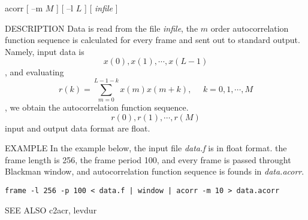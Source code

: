 
\begin{synopsis}
 \item[ acorr ] [ --m $M$ ] [ --l $L$ ] [ {\em infile} ]
\end{synopsis}

\begin{qsection}{DESCRIPTION}
 Data is read from the file {\em infile}, the $m$ order autocorrelation
 function sequence is calculated for every frame and sent out to standard
 output. Namely, input data is
\[ x(0),x(1),\cdots,x(L-1) \],
 and evaluating 
\[ r(k)=\sum_{m=0}^{L-1-k}x(m)x(m+k),~~~~~~k=0,1,\cdots,M \],
 we obtain the autocorrelation function sequence.
\[ r(0),r(1),\cdots,r(M) \]
 input and output data format are float.
\end{qsection}

\begin{options}
\end{options}

\begin{qsection}{EXAMPLE}
In the example below, the input file {\em data.f} is in float format.
the frame length is 256, the frame period 100, and every frame is
passed throught Blackman window, and autocorrelation function sequence
is founds in {\em data.acorr}.
\begin{center}
 \verb!frame -l 256 -p 100 < data.f | window | acorr -m 10 > data.acorr!
\end{center}
\end{qsection}

\begin{qsection}{SEE ALSO}
 c2acr, levdur
\end{qsection}